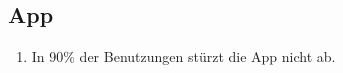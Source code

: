 \subsection{App}

\begin{enumerate}
    \item In 90\% der Benutzungen stürzt die App nicht ab.
\end{enumerate}